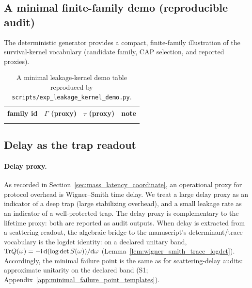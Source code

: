 \subsection{A minimal finite-family demo (reproducible audit)}
\label{subsec:leakage_kernel_demo}

\AuditTag The deterministic generator  provides a compact, finite-family illustration of the survival-kernel vocabulary (candidate family, CAP selection, and reported proxies).

\begin{table}[t]
\centering
\scriptsize
\setlength{\tabcolsep}{6pt}
\renewcommand{\arraystretch}{1.15}
\begin{tabular}{l r r l}
\toprule
family id & $\Gamma$ (proxy) & $\tau$ (proxy) & note \\
\midrule
%
\\
\bottomrule
\end{tabular}
\caption{A minimal leakage-kernel demo table reproduced by \texttt{scripts/exp\_leakage\_kernel\_demo.py}.}
\label{tab:leakage_kernel_demo}
\end{table}

\subsection{Delay as the trap readout}
\label{subsec:leakage_delay_readout}

\paragraph{Delay proxy.}
\InterfaceTag As recorded in Section~\ref{sec:mass_latency_coordinate}, an operational proxy for protocol overhead is Wigner--Smith time delay.
We treat a large delay proxy as an indicator of a deep trap (large stabilizing overhead), and a small leakage rate as an indicator of a well-protected trap.
The delay proxy is complementary to the lifetime proxy: both are reported as audit outputs.
\AuditTag When delay is extracted from a scattering readout, the algebraic bridge to the manuscript's determinant/trace vocabulary is the logdet identity:
on a declared unitary band, $\mathrm{Tr} Q(\omega)=-\mathrm{i}\,\mathrm{d}(\log\det S(\omega))/\mathrm{d}\omega$ (Lemma~\ref{lem:wigner_smith_trace_logdet}).
Accordingly, the minimal failure point is the same as for scattering-delay audits: approximate unitarity on the declared band (S1; Appendix~\ref{app:minimal_failure_point_templates}).

